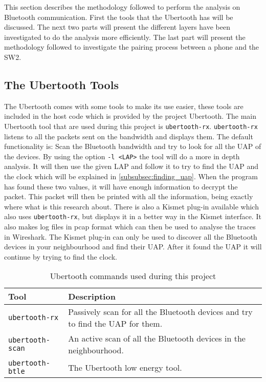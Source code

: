 This section describes the methodology followed to perform the analysis on Bluetooth communication. First the tools that the Ubertooth has will be discussed. The next two parts will present the different layers have been investigated to do the analysis more efficiently. The last part will present the methodology followed to investigate the pairing process between a phone and the SW2.

\subsection{The Ubertooth Tools}
\label{subsubsec:ubertooth_tools}
The Ubertooth comes with some tools to make its use easier, these tools are included in the host code which is provided by the project Ubertooth.
The main Ubertooth tool that are used during this project is \verb|ubertooth-rx|. \verb|ubertooth-rx| listens to all the packets sent on the bandwidth and displays them. The default functionality is: Scan the Bluetooth bandwidth and try to look for all the UAP of the devices. By using the option \verb|-l <LAP>| the tool will do a more in depth analysis. It will then use the given LAP and follow it to try to find the UAP and the clock which will be explained in \ref{subsubsec:finding_uap}. When the program has found these two values, it will have enough information to decrypt the packet. This packet will then be printed with all the information, being exactly where what is this research about. \pend There is also a Kismet plug-in available which also uses \verb|ubertooth-rx|, but displays it in a better way in the Kismet interface. It also makes log files in pcap format which can then be used to analyse the traces in Wireshark. The Kismet plug-in can only be used to discover all the Bluetooth devices in your neighbourhood and find their UAP. After it found the UAP it will continue by trying to find the clock.

\begin{table}[!h]
\begin{tabular}{|l|l|}
\hline
Tool & Description \\
\hline
\verb|ubertooth-rx| & Passively scan for all the Bluetooth devices and try to find the UAP for them. \\
\hline
\verb|ubertooth-scan| & An active scan of all the Bluetooth devices in the neighbourhood.  \\
\hline
\verb|ubertooth-btle| & The Ubertooth low energy tool. \\
\hline
\end{tabular}
\caption{Ubertooth commands used during this project}
\label{tab:ubertooth_tools}
\end{table}
